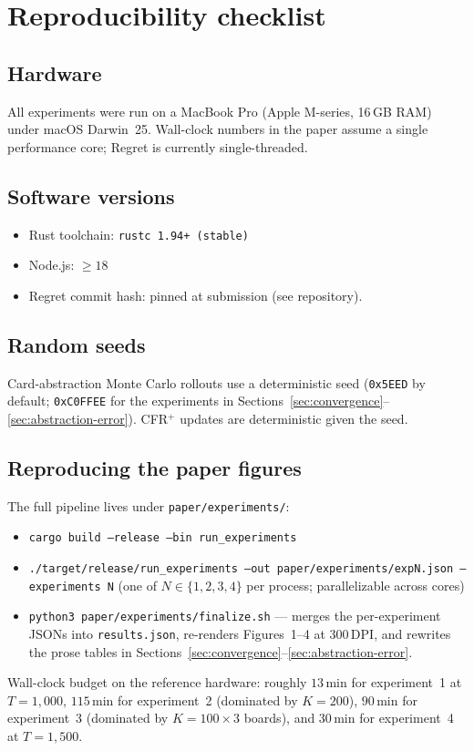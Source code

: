 \section{Reproducibility checklist}
\label{app:reproducibility}

\subsection*{Hardware}
All experiments were run on a MacBook Pro (Apple M-series, 16\,GB RAM)
under macOS Darwin~25. Wall-clock numbers in the paper assume a single
performance core; Regret is currently single-threaded.

\subsection*{Software versions}
\begin{itemize}
  \item Rust toolchain: \texttt{rustc 1.94+ (stable)}
  \item Node.js: $\geq 18$
  \item Regret commit hash: pinned at submission (see repository).
\end{itemize}

\subsection*{Random seeds}
Card-abstraction Monte Carlo rollouts use a deterministic seed
(\texttt{0x5EED} by default; \texttt{0xC0FFEE} for the experiments in
Sections~\ref{sec:convergence}--\ref{sec:abstraction-error}). CFR$^+$
updates are deterministic given the seed.

\subsection*{Reproducing the paper figures}
The full pipeline lives under \texttt{paper/experiments/}:
\begin{itemize}
  \item \texttt{cargo build --release --bin run\_experiments}
  \item \texttt{./target/release/run\_experiments --out paper/experiments/expN.json --experiments N}
        (one of $N\in\{1,2,3,4\}$ per process; parallelizable across cores)
  \item \texttt{python3 paper/experiments/finalize.sh} --- merges the
        per-experiment JSONs into \texttt{results.json}, re-renders
        Figures~1--4 at 300\,DPI, and rewrites the prose tables in
        Sections~\ref{sec:convergence}--\ref{sec:abstraction-error}.
\end{itemize}
Wall-clock budget on the reference hardware: roughly $13$\,min for
experiment~1 at $T\!=\!1{,}000$, $115$\,min for experiment~2 (dominated
by $K\!=\!200$), $90$\,min for experiment~3 (dominated by $K\!=\!100\!\times\!3$ boards),
and $30$\,min for experiment~4 at $T\!=\!1{,}500$.

